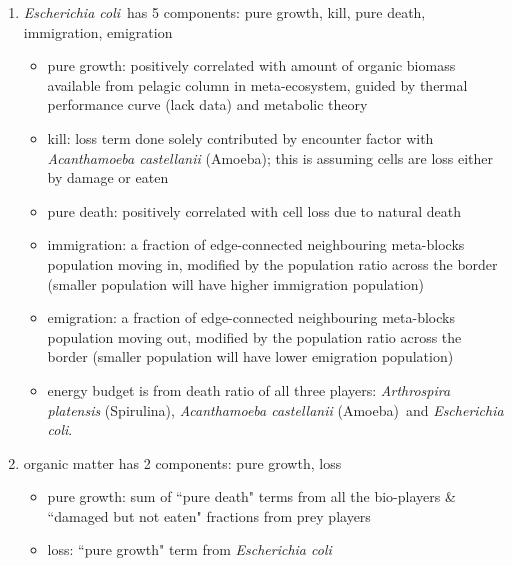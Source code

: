 \documentclass[a4paper,11pt]{article}
\newcommand{\ec}{\textit{Escherichia coli}}
\newcommand{\am}{\textit{Acanthamoeba castellanii} (Amoeba)}
\newcommand{\ap}{\textit{Arthrospira platensis} (Spirulina)}
\begin{document}
\begin{enumerate}
        \item \ec\ has 5 components: pure growth, kill, pure death, immigration, emigration
        \begin{itemize}
            \item pure growth: positively correlated with amount of organic biomass available from pelagic column in meta-ecosystem, guided by thermal performance curve (lack data) and metabolic theory\autocite{schramski2015metabolic}
            \item kill: loss term done solely contributed by encounter factor with \am; this is assuming cells are loss either by damage or eaten
            \item pure death: positively correlated with cell loss due to natural death
            \item immigration: a fraction of edge-connected neighbouring meta-blocks population moving in, modified by the population ratio across the border (smaller population will have higher immigration population)
            \item emigration: a fraction of edge-connected neighbouring meta-blocks population moving out, modified by the population ratio across the border (smaller population will have lower emigration population)
            \item energy budget is from death ratio of all three players: \ap, \am\ and \ec.
        \end{itemize}
        
        \item organic matter has 2 components: pure growth, loss
        \begin{itemize}
            \item pure growth: sum of ``pure death" terms from all the bio-players \& ``damaged but not eaten" fractions from prey players
            \item loss: ``pure growth" term from \ec
        \end{itemize}
    \end{enumerate}
    
\end{document}
